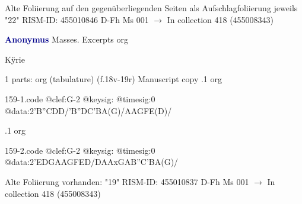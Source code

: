 \documentclass[twocolumn]{book}
\begin{document}
\newline Alte Foliierung auf den gegenüberliegenden Seiten als Aufschlagfoliierung jeweils "22"
\newline RISM-ID: 455010846
\newline D-Fh  Ms 001
\newline $\rightarrow$ In collection 418 (455008343)
      
\newline \par \vspace{7pt} \textcolor{darkblue}{\textbf{Anonymus  }}
\newline Masses. Excerpts
\newline org
\newline \begin{itshape}[f.18v, at left:] Kÿrie\end{itshape} 
\newline \textcolor{darkblue}{}  1 parts: org (tabulature)  (f.18v-19r)
\newline Manuscript copy
.1  org  
\begin{filecontents*}{159-1.code}
@clef:G-2
@keysig:
@timesig:0
@data:2'B''CDD/'B''DC'BA(G)/AAGFE(D)/
\end{filecontents*}
\newline
%

.1  org  
\begin{filecontents*}{159-2.code}
@clef:G-2
@keysig:
@timesig:0
@data:2'EDGAAGFED/DAAxGAB''C'BA(G)/
\end{filecontents*}
\newline
%

\newline Alte Foliierung vorhanden: "19"
\newline RISM-ID: 455010837
\newline D-Fh  Ms 001
\newline $\rightarrow$ In collection 418 (455008343)
      
\end{document}
